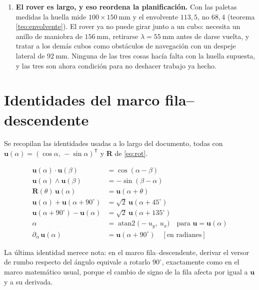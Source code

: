 \documentclass[11pt,a4paper]{article}
\theoremstyle{definition}
\newcommand{\Rot}{\mathbf{R}}
\newcommand{\uu}{\mathbf{u}}
\newcommand{\atantwo}{\operatorname{atan2}}
\newcommand{\grados}{^{\circ}}
\begin{document}
\begin{resultado}
\begin{enumerate}[label=\arabic*.,leftmargin=2.4em,itemsep=4pt]
      fuera de él son pérdidas definitivas, no incidentes. Verificar el corredor
      completo antes de comprometerse a un empuje es más importante que cualquier
      optimización de ruta (sección \ref{sec:precipicio}).
\item \textbf{El rover es largo, y eso reordena la planificación.} Con las paletas
      medidas la huella mide $100 \times 150\ \mathrm{mm}$ y el envolvente $113{,}5$, no
      $68{,}4$ (teorema \ref{teo:envolvente}). El rover ya no puede girar junto a un
      cubo: necesita un anillo de maniobra de $156\ \mathrm{mm}$, retirarse
      $\lambda = 55\ \mathrm{mm}$ antes de darse vuelta, y tratar a los demás cubos como
      obstáculos de navegación con un despeje lateral de $92\ \mathrm{mm}$. Ninguna de
      las tres cosas hacía falta con la huella supuesta, y las tres son ahora condición
      para no deshacer trabajo ya hecho.
\end{enumerate}
\end{resultado}

\appendix

\section{Identidades del marco fila--descendente}

Se recopilan las identidades usadas a lo largo del documento, todas con
$\uu(\alpha) = (\cos\alpha,\,-\sin\alpha)^{\mathsf T}$ y $\Rot$ de \eqref{eq:rot}.

\begin{align}
  \uu(\alpha)\cdot\uu(\beta) &= \cos(\alpha-\beta) \\
  \uu(\alpha)\wedge\uu(\beta) &= -\sin(\beta-\alpha) \\
  \Rot(\theta)\,\uu(\alpha) &= \uu(\alpha+\theta) \\
  \uu(\alpha) + \uu(\alpha+90\grados) &= \sqrt2\ \uu(\alpha+45\grados) \\
  \uu(\alpha+90\grados) - \uu(\alpha) &= \sqrt2\ \uu(\alpha+135\grados) \\
  \alpha &= \atantwo\big(-u_y,\ u_x\big) \quad\text{para } \uu = \uu(\alpha) \\
  \partial_\alpha\,\uu(\alpha) &= \uu(\alpha+90\grados) \quad [\text{en radianes}]
\end{align}

La última identidad merece nota: en el marco fila--descendente, derivar el versor de
rumbo respecto del ángulo equivale a rotarlo $90\grados$, exactamente como en el marco
matemático usual, porque el cambio de signo de la fila afecta por igual a $\uu$ y a su
derivada.
\end{document}

